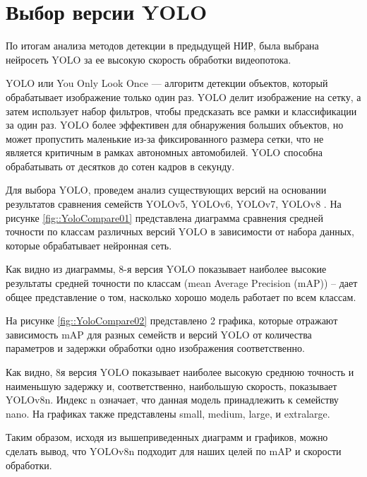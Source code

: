\section{Выбор версии YOLO}

По итогам анализа методов детекции в предыдущей НИР, была выбрана нейросеть YOLO
за ее высокую скорость обработки видеопотока. 

YOLO или You Only Look Once — алгоритм детекции объектов, который обрабатывает
изображение только один раз. YOLO делит изображение на сетку, а затем использует
набор фильтров, чтобы предсказать все рамки и классификации за один раз. YOLO 
более эффективен для обнаружения больших объектов, но может пропустить маленькие
из-за фиксированного размера сетки, что не является критичным в рамках автономных
автомобилей. YOLO способна обрабатывать от десятков до сотен кадров в секунду.

Для выбора YOLO, проведем анализ существующих версий на основании результатов
сравнения семейств YOLOv5, YOLOv6, YOLOv7, YOLOv8 \cite{site::YoloCompare,
article::Hussain2023}. На рисунке \ref{fig::YoloCompare01} представлена диаграмма
сравнения средней точности по классам различных версий YOLO в зависимости от 
набора данных, которые обрабатывает нейронная сеть. 


Как видно из диаграммы, 8-я версия YOLO показывает наиболее высокие результаты 
средней точности по классам (mean Average Precision (mAP)) -- дает общее 
представление о том, насколько хорошо модель работает по всем классам. 

На рисунке \ref{fig::YoloCompare02} представлено 2 графика, которые отражают 
зависимость mAP для разных семейств и версий YOLO от количества параметров и
задержки обработки одно изображения соответственно. 


Как видно, 8я версия YOLO показывает наиболее высокую среднюю точность и наименьшую
задержку и, соответственно, наибольшую скорость, показывает YOLOv8n. Индекс n
означает, что данная модель принадлежить к семейству nano. На графиках также 
представлены small, medium, large, и extralarge. 

Таким образом, исходя из вышеприведенных диаграмм и графиков, можно сделать вывод,
что YOLOv8n подходит для наших целей по mAP и скорости обработки. 

